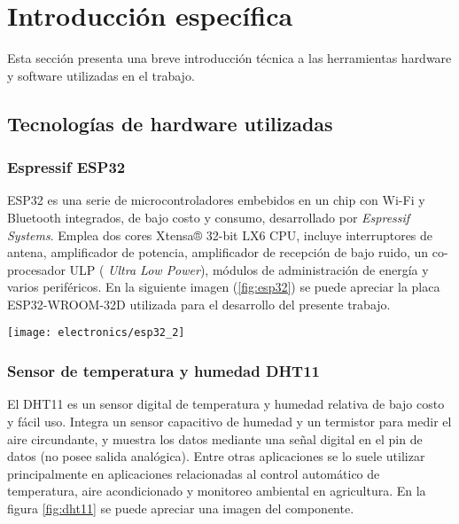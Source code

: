
\chapter{Introducción específica} %

\label{Chapter2}

Esta sección presenta una breve introducción técnica a las herramientas hardware y software utilizadas en el trabajo.

\section{Tecnologías de hardware utilizadas}

\subsection{Espressif ESP32}


ESP32 \cite{ESP32} es una serie de microcontroladores embebidos en un chip con Wi-Fi y Bluetooth integrados, de bajo costo y consumo, desarrollado por \textit{Espressif Systems}. Emplea dos cores Xtensa® 32-bit LX6 CPU, incluye interruptores de antena, amplificador de potencia, amplificador de recepción de bajo ruido, un co-procesador ULP (\textit{ Ultra Low Power}), módulos de administración de energía y varios periféricos.
En la siguiente imagen (\ref{fig:esp32}) se puede apreciar la placa ESP32-WROOM-32D \cite{ESP32_wroom_32d_datasheet} utilizada para el desarrollo del presente trabajo.

\begin{center}
   \texttt{[image: electronics/esp32\_2]}
   \label{fig:esp32}
\end{center}


\subsection{Sensor de temperatura y humedad DHT11}

El DHT11 \cite{DHT11_datasheet} es un sensor digital de temperatura y humedad relativa de bajo costo y fácil uso. Integra un sensor capacitivo de humedad y un termistor para medir el aire circundante, y muestra los datos mediante una señal digital en el pin de datos (no posee salida analógica). Entre otras aplicaciones se lo suele utilizar principalmente en aplicaciones relacionadas al control automático de temperatura, aire acondicionado y monitoreo ambiental en agricultura. En la figura \ref{fig:dht11} se puede apreciar una imagen del componente.

